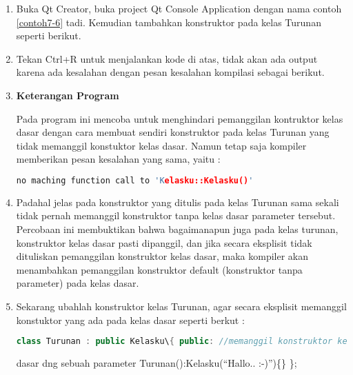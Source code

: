 \begin{enumerate}

\item
  Buka Qt Creator, buka project Qt Console Application dengan nama
  contoh \ref{contoh7-6} tadi. Kemudian tambahkan konstruktor pada kelas Turunan
  seperti berikut.




\item
  Tekan Ctrl+R untuk menjalankan kode di atas, tidak akan ada output
  karena ada kesalahan dengan pesan kesalahan kompilasi sebagai berikut.
  
  \begin{figure}[htbp]
  	\centering
{}
  	
  \end{figure}

\item \textbf{Keterangan Program}

Pada program ini mencoba untuk menghindari pemanggilan kontruktor kelas
dasar dengan cara membuat sendiri konstruktor pada kelas Turunan yang
tidak memanggil konstuktor kelas dasar. Namun tetap saja kompiler
memberikan pesan kesalahan yang sama, yaitu :

\begin{lstlisting}[language=c++, numbers=none]
no maching function call to 'Kelasku::Kelasku()' 
\end{lstlisting}

\item Padahal jelas pada konstruktor yang ditulis pada kelas Turunan sama
sekali tidak pernah memanggil konstruktor tanpa kelas dasar parameter
tersebut. Percobaan ini membuktikan bahwa bagaimanapun juga pada kelas
turunan, konstruktor kelas dasar pasti dipanggil, dan jika secara
eksplisit tidak dituliskan pemanggilan konstruktor kelas dasar, maka
kompiler akan menambahkan pemanggilan konstruktor default (konstruktor
tanpa parameter) pada kelas dasar.


\item
  Sekarang ubahlah konstruktor kelas Turunan, agar secara eksplisit
  memanggil konstuktor yang ada pada kelas dasar seperti berkut :
\begin{lstlisting}[language=c++, numbers=none]
class Turunan : public Kelasku\{ public: //memanggil konstruktor kelas
\end{lstlisting}
  
dasar dng sebuah parameter Turunan():Kelasku(``Hallo.. :-)'')\{\} \};
\end{enumerate}

